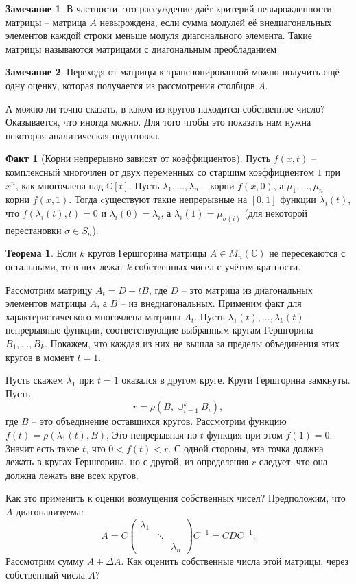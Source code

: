 \documentclass[12pt,a4paper,oneside]{book}
\theoremstyle{definition}
\newtheorem*{rem}{\color{green!50!blue}Замечание}
\newtheorem*{fact}{Факт}
\newtheorem{thm}{\color{red!40!black}Теорема}
\renewcommand{\C}{\mathbb C}
\def\thrm{\begin{thm}}
\def\ethrm{\end{thm}}
\def\rm{\begin{rem}}
\def\erm{\end{rem}}
\def\fct{\begin{fact}}
\def\efct{\end{fact}}
\def\pmat{\begin{pmatrix}}
\def\epmat{\end{pmatrix}}
\begin{document}
\rm В частности, это рассуждение даёт критерий невырожденности матрицы -- матрица $A$ невырождена, если сумма модулей её внедиагональных элементов каждой строки меньше модуля диагонального элемента. Такие матрицы называются матрицами с диагональным преобладанием
\erm

\rm
Переходя от матрицы к транспонированной можно получить ещё одну оценку, которая получается из рассмотрения столбцов $A$.
\erm

А можно ли точно сказать, в каком из кругов находится собственное число? Оказывается, что иногда можно. Для того чтобы это показать нам нужна некоторая аналитическая подготовка.

\fct[Корни непрерывно зависят от коэффициентов] Пусть $f(x,t)$ -- комплексный многочлен от двух переменных со старшим коэффициентом $1$ при $x^n$, как многочлена над $\C[t]$. Пусть $\lambda_1,\dots,\lambda_n$ -- корни $f(x,0)$, а $\mu_1,\dots, \mu_n$ -- корни $f(x,1)$. Тогда cуществуют такие непрерывные на $[0,1]$ функции $\lambda_i(t)$, что $f(\lambda_i(t),t)=0$ и $\lambda_i(0)=\lambda_i$, а $\lambda_i(1)=\mu_{\sigma(i)}$ (для некоторой перестановки $\sigma \in S_n$).
\efct

\thrm Если $k$ кругов Гершгорина матрицы $A\in M_n(\C)$ не пересекаются с остальными, то в них лежат $k$ собственных чисел с учётом кратности.
\ethrm
\proof Рассмотрим матрицу $A_t= D+ tB$, где $D$ -- это матрица из диагональных элементов матрицы $A$, а $B$ -- из внедиагональных. Применим факт для характеристического многочлена матрицы $A_t$. Пусть  $\lambda_1(t),\dots,\lambda_k(t)$ -- непрерывные функции, соответствующие выбранным кругам Гершгорина $B_1,\dots,B_k$. Покажем, что каждая из них не вышла за пределы объединения этих кругов в момент $t=1$. 

Пусть скажем $\lambda_1$ при $t=1$ оказался в другом круге. Круги Гершгорина замкнуты. Пусть 
$$r=\rho(B,\cup_{i=1}^k B_i),$$
где $B$ -- это объединение оставшихся кругов. Рассмотрим функцию $f(t)=\rho(\lambda_1(t),B)$,  Это непрерывная по $t$ функция при этом $f(1)=0$. Значит есть такое $t$, что $0<f(t)<r$. С одной стороны, эта точка должна лежать в кругах Гершгорина, но с другой, из определения $r$ следует, что она должна лежать вне всех кругов.  
\endproof

Как это применить к оценки возмущения собственных чисел? Предположим, что $A$ диагонализуема:
$$A=C\pmat \lambda_1 && \\ & \ddots & \\ && \lambda_n \epmat C^{-1}=CDC^{-1}.$$
Рассмотрим сумму $A+\Delta A$. Как оценить собственные числа этой матрицы, через собственный числа $A$?
\end{document}
